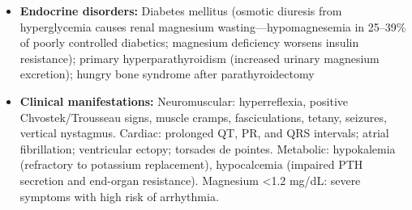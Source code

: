 \begin{itemize}
  \item \textbf{Endocrine disorders:} Diabetes mellitus (osmotic diuresis from hyperglycemia causes renal magnesium wasting---hypomagnesemia in 25--39\% of poorly controlled diabetics; magnesium deficiency worsens insulin resistance); primary hyperparathyroidism (increased urinary magnesium excretion); hungry bone syndrome after parathyroidectomy
  \item \textbf{Clinical manifestations:} Neuromuscular: hyperreflexia, positive Chvostek/Trousseau signs, muscle cramps, fasciculations, tetany, seizures, vertical nystagmus. Cardiac: prolonged QT, PR, and QRS intervals; atrial fibrillation; ventricular ectopy; torsades de pointes. Metabolic: hypokalemia (refractory to potassium replacement), hypocalcemia (impaired PTH secretion and end-organ resistance). Magnesium <1.2 mg/dL: severe symptoms with high risk of arrhythmia.
\end{itemize}

